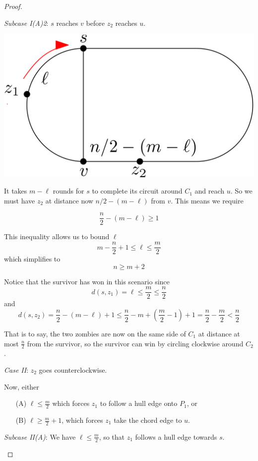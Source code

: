 \documentclass[letterpaper, 10pt]{article}
\begin{document}
\begin{proof}
\begin{proofpart}
\emph{Subcase I(A)2}: $s$ reaches $v$ before $z_2$ reaches $u$.

\begin{center}
\includegraphics[scale=0.15]{diagramCaseIA2_1}
\end{center}

It takes $m-\ell$ rounds for $s$ to complete its circuit around $C_1$ and reach $u$. So
we must have $z_2$ at distance now $n/2 - (m-\ell)$ from $v$. This means we require

\[ \frac{n}{2} - (m-\ell) \geq 1 \]

This inequality allows us to bound $\ell$
\[ m - \frac{n}{2} +1 \leq \ell \leq \frac{m}{2}\]
which simplifies to
\[ n \geq m+2 \]

Notice that the survivor has won in this scenario since
\[ d(s,z_1) = \ell \leq \frac{m}{2} \leq \frac{n}{2} \]
and
\[ d(s,z_2) = \frac{n}{2} - (m - \ell) + 1 \leq \frac{n}{2} - m + \left(\frac{m}{2} -1\right) +1 = \frac{n}{2} - \frac{m}{2} < \frac{n}{2} \]

That is to say, the two zombies are now on the same side of $C_1$ at distance at most $\frac{n}{2}$
from the survivor, so the survivor can win by circling clockwise around $C_2$.

\emph{Case II}: $z_2$ goes counterclockwise.

Now, either
\begin{enumerate}
\item[(A)] $\ell \leq \frac{m}{2}$
    which forces $z_1$ to follow a hull edge onto $P_1$, or
\item[(B)] $\ell \geq \frac{m}{2} + 1$,
    which forces $z_1$ take the chord edge to $u$.
\end{enumerate}

\emph{Subcase II(A)}: We have $\ell \leq \frac{m}{2}$, so that $z_1$ follows a hull edge towards $s$.


\end{proofpart}
\end{proof}
\end{document}
